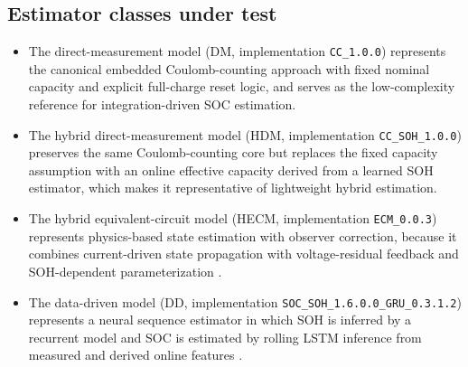 \documentclass[review]{elsarticle}
\begin{document}
\subsection{Estimator classes under test}
\begin{itemize}[leftmargin=*]
    \item The direct-measurement model (DM, implementation \texttt{CC\_1.0.0}) represents the canonical embedded Coulomb-counting approach with fixed nominal capacity and explicit full-charge reset logic, and serves as the low-complexity reference for integration-driven SOC estimation.
    \item The hybrid direct-measurement model (HDM, implementation \texttt{CC\_SOH\_1.0.0}) preserves the same Coulomb-counting core but replaces the fixed capacity assumption with an online effective capacity derived from a learned SOH estimator, which makes it representative of lightweight hybrid estimation.
    \item The hybrid equivalent-circuit model (HECM, implementation \texttt{ECM\_0.0.3}) represents physics-based state estimation with observer correction, because it combines current-driven state propagation with voltage-residual feedback and SOH-dependent parameterization \cite{gaoEnhancedStateofchargeEstimation2022,guoSystematicReviewElectrochemical2024}.
    \item The data-driven model (DD, implementation \texttt{SOC\_SOH\_1.6.0.0\_GRU\_0.3.1.2}) represents a neural sequence estimator in which SOH is inferred by a recurrent model and SOC is estimated by rolling LSTM inference from measured and derived online features \cite{mondalEstimatingStateofChargeLithiumIon2024,yaoSmarterBatteryManagement2025b}.
\end{itemize}
\end{document}
